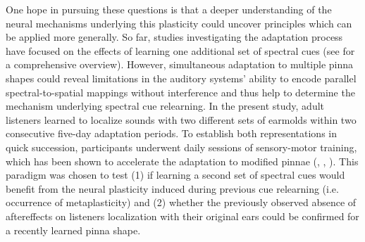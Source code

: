 One hope in pursuing these questions is that a deeper understanding of the neural mechanisms underlying this plasticity could uncover principles which can be applied more generally. So far, studies investigating the adaptation process have focused on the effects of learning one additional set of spectral cues (see \citet{carlile_plastic_2014} for a comprehensive overview). However, simultaneous adaptation to multiple pinna shapes could reveal limitations in the auditory systems' ability to encode parallel spectral-to-spatial mappings without interference and thus help to determine the mechanism underlying spectral cue relearning. In the present study, adult listeners learned to localize sounds with two different sets of earmolds within two consecutive five-day adaptation periods. To establish both representations in quick succession, participants underwent daily sessions of sensory-motor training, which has been shown to accelerate the adaptation to modified pinnae (\citet{carlile_relearning_2014}, \citet{parseihian_rapid_2012}, \citet{trapeau_fast_2016}). This paradigm was chosen to test (1) if learning a second set of spectral cues would benefit from the neural plasticity induced during previous cue relearning (i.e. occurrence of metaplasticity) and (2) whether the previously observed absence of aftereffects on listeners localization with their original ears could be confirmed for a recently learned pinna shape.